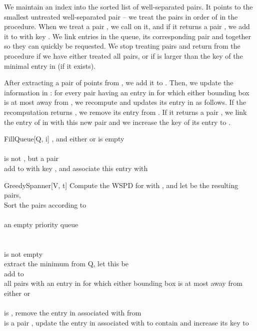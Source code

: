 \documentclass[runningheads,envcountsame,oribibl,orivec]{llncs}
\begin{document}
We maintain an index  into the sorted list of well-separated pairs. It points to the smallest untreated well-separated pair -- we treat the pairs in order of  in the  procedure. When we treat a pair , we call  on it, and if it returns a pair , we add it to  with key . We link entries in the queue, its corresponding pair  and  together so they can quickly be requested. We stop treating pairs and return from the procedure if we have either treated all pairs, or if  is larger than the key of the minimal entry in  (if it exists).

After extracting a pair of points  from , we add it to . Then, we update the information in : for every pair  having an entry in  for which either bounding box is at most  away from , we recompute  and updates its entry in  as follows. If the recomputation returns \qnil, we remove its entry from . If it returns a pair , we link the entry of  in  with this new pair and we increase the key of its entry to .

\begin{algorithm}{FillQueue}[Q, i]{}
  \qwhile \label{algo:guard} , and either  or  is empty
  \\ \qdo  {}
       \\ \qif  is not \qnil, but a pair 
       \\ \qthen add  to  with key , and associate this entry with 
          \qendif
       \\ 
  \qend
\end{algorithm}

\begin{algorithm}{GreedySpanner}[V, t]{\label{algo:Greedy}}
  Compute the WSPD  for  with , and let  be the resulting pairs, 
  \\ Sort the pairs  according to 
  \\ 
  \\  an empty priority queue
  \\ 
  \\ \label{algo:fill} 
  \\ \qwhile  is not empty
  \\ \qdo extract the minimum from Q, let this be 
       \\ \label{algo:add} add  to 
       \\ \qfor \label{algo:loop} all pairs  with an entry in  for which either bounding box is at most  away from either  or 
       \\ \qdo  {}
            \\ \label{algo:update1} \qif  is \qnil, remove the entry in  associated with  from  \qendif
            \\ \label{algo:update2} \qif  is a pair , update the entry in  associated with  to contain  and increase its key to  \qendif
          \qendfor
       \\ 
     \qend
  \\ \qreturn 
\end{algorithm}
\end{document}
